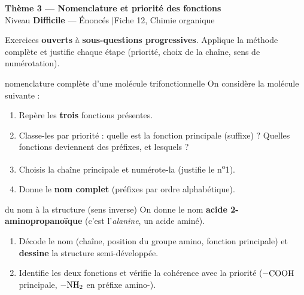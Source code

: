\documentclass[11pt,a4paper]{article}
\newcommand{\banner}[2]{%
\begin{tcolorbox}[enhanced,colback=primary,colframe=primary,arc=5pt,boxrule=0pt,
   left=5mm,right=5mm,top=2.5mm,bottom=2.5mm,coltext=white]
{\large\bfseries #1}\\[1pt]{\small #2}
\end{tcolorbox}\vspace{2pt}}
\begin{document}
\banner{Thème 3 — Nomenclature et priorité des fonctions}{Niveau \textbf{Difficile} — Énoncés \quad$\vert$\quad Fiche 12, Chimie organique}

\begin{consigne}
Exercices \textbf{ouverts} à \textbf{sous-questions progressives}. Applique la méthode complète et justifie chaque étape (priorité, choix de la chaîne, sens de numérotation).
\end{consigne}

\begin{exo}{nomenclature complète d'une molécule trifonctionnelle}
On considère la molécule suivante :
\begin{center}\end{center}
\begin{enumerate}[label=\textbf{\alph*)},leftmargin=2em,itemsep=1pt]
  \item Repère les \textbf{trois} fonctions présentes.
  \item Classe-les par priorité : quelle est la fonction principale (suffixe) ? Quelles fonctions deviennent des préfixes, et lesquels ?
  \item Choisis la chaîne principale et numérote-la (justifie le n\textsuperscript{o}1).
  \item Donne le \textbf{nom complet} (préfixes par ordre alphabétique).
\end{enumerate}
\end{exo}

\begin{exo}{du nom à la structure (sens inverse)}
On donne le nom \textbf{acide 2-aminopropanoïque} (c'est l'\emph{alanine}, un acide aminé).
\begin{enumerate}[label=\textbf{\alph*)},leftmargin=2em,itemsep=1pt]
  \item Décode le nom (chaîne, position du groupe amino, fonction principale) et \textbf{dessine} la structure semi-développée.
  \item Identifie les deux fonctions et vérifie la cohérence avec la priorité ($\ce{-COOH}$ principale, $\ce{-NH2}$ en préfixe amino-).
\end{enumerate}
\end{exo}
\end{document}
